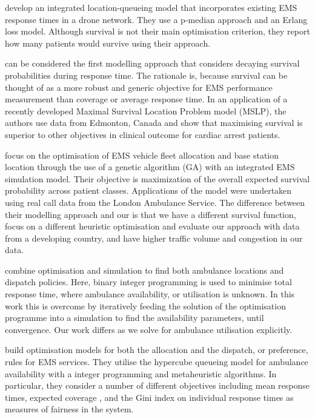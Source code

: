 \documentclass[numbers,webpdf,imaman]{ima-authoring-template}%
\begin{document}
\citet{boutilier2022drone} develop an integrated location-queueing model that
incorporates existing EMS response times in a drone network. They use a
p-median approach and an Erlang loss model. Although survival is not their
main optimisation criterion,  they report how many patients would survive
using their approach.

\citet{Erkut200842} can be considered the first modelling approach
that considers decaying survival probabilities during response time. The
rationale is, because survival can be thought of as a more robust and generic
objective for EMS performance measurement than coverage or average response
time. In an application of a recently developed Maximal Survival Location
Problem model (MSLP), the authors use data from Edmonton, Canada and show that
maximising survival is superior to other objectives in clinical outcome for
cardiac arrest patients.

\citet{MCormack2015} focus on the optimisation of
EMS vehicle fleet allocation and base station location through the use of a
genetic algorithm (GA) with an integrated EMS simulation model. Their
objective is maximization of the overall expected survival probability across
patient classes. Applications of the model were undertaken using real call
data from the London Ambulance Service. The difference between their modelling
approach and our is that we have a different survival function, focus on a
different heuristic optimisation and evaluate our approach with data from a
developing country, and have higher traffic volume and congestion in our data.

\citet{belanger20} combine optimisation and simulation to find
both ambulance locations and dispatch policies. Here, binary integer programming 
is used to minimise total response time, where ambulance availability, or
utilisation is unknown. In this work this is overcome by iteratively feeding the
solution of the optimisation programme into a simulation to find the
availability parameters, until convergence. Our work differs as we solve for
ambulance utilisation explicitly.

\citet{torodiaz13, torodiaz15} build
optimisation models for both the allocation and the dispatch, or preference,
rules for EMS services. They utilise the hypercube queueing model for ambulance
availability with a integer programming and metaheuristic algorithms. In
particular, they consider a number of different objectives including mean
response times, expected coverage \citep{daskin83}, and the Gini index on
individual response times as measures of fairness in the system.
\end{document}
